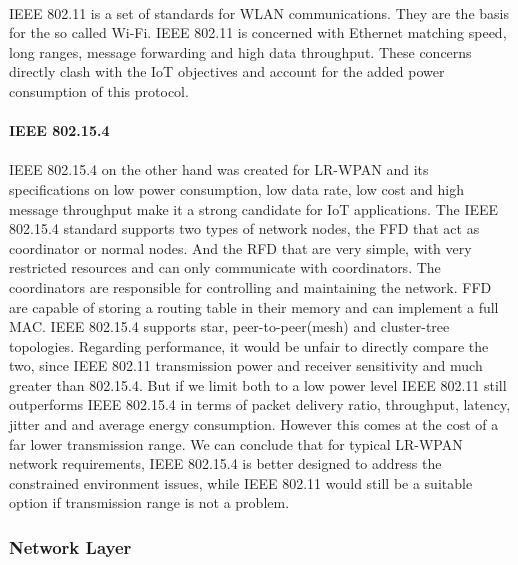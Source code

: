 \paragraph{}
IEEE 802.11 is a set of standards for \ac{WLAN} communications. They are the basis for the so called Wi-Fi. IEEE 802.11 is concerned with Ethernet matching speed, long ranges, message forwarding and high data throughput. These concerns directly clash with the \ac{IoT} objectives and account for the added power consumption of this protocol.

\paragraph{\textbf{IEEE 802.15.4}}
\paragraph{}
IEEE 802.15.4 on the other hand was created for \ac{LR-WPAN} and its specifications on low power consumption, low data rate, low cost and high message throughput make it a strong candidate for \ac{IoT} applications.
	The IEEE 802.15.4 standard supports two types of network nodes, the \ac{FFD} that act as coordinator or normal nodes. And the \ac{RFD} that are very simple, with very restricted resources and can only communicate with coordinators. The coordinators are responsible for controlling and maintaining the network. \ac{FFD} are capable of storing a routing table in their memory and can implement a full \ac{MAC}.
	IEEE 802.15.4 supports star, peer-to-peer(mesh) and cluster-tree topologies.
	Regarding performance, it would be unfair to directly compare the two, since IEEE 802.11 transmission power and receiver sensitivity and much greater than 802.15.4. But if we limit both to a low power level IEEE 802.11 still outperforms IEEE 802.15.4 in terms of packet delivery ratio, throughput, latency, jitter and and average energy consumption. However this comes at the cost of a far lower transmission range\cite{Transmission2011}.
	We can conclude that for typical \ac{LR-WPAN} network requirements, IEEE 802.15.4 is better designed to address the constrained environment issues, while IEEE 802.11 would still be a suitable option if transmission range is not a problem.

\subsubsection{Network Layer}
\label{sec:network_layer}


